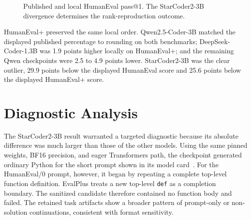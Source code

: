 \documentclass[10pt,twocolumn]{article}
\newcommand{\code}[1]{\texttt{#1}}
\begin{document}
\begin{figure}[t]
\centering
{}
\caption{Published and local HumanEval pass@1. The StarCoder2-3B divergence determines the rank-reproduction outcome.}
\label{fig:results}
\end{figure}

HumanEval+ preserved the same local order. Qwen2.5-Coder-3B matched the displayed published percentage to rounding on both benchmarks; DeepSeek-Coder-1.3B was 1.9 points higher locally on HumanEval+; and the remaining Qwen checkpoints were 2.5 to 4.9 points lower. StarCoder2-3B was the clear outlier, 29.9 points below the displayed HumanEval score and 25.6 points below the displayed HumanEval+ score.

\section{Diagnostic Analysis}

The StarCoder2-3B result warranted a targeted diagnostic because its absolute difference was much larger than those of the other models. Using the same pinned weights, BF16 precision, and eager Transformers path, the checkpoint generated ordinary Python for the short prompt shown in its model card~\citep{bigcode2024starcoder2card}. For the HumanEval/0 prompt, however, it began by repeating a complete top-level function definition. EvalPlus treats a new top-level \code{def} as a completion boundary. The sanitized candidate therefore contained no function body and failed. The retained task artifacts show a broader pattern of prompt-only or non-solution continuations, consistent with format sensitivity.
\end{document}
